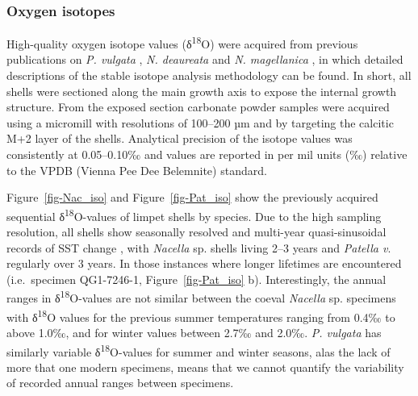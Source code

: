 \documentclass[
  authoryear,
  preprint,
  3p]{elsarticle}
\begin{document}
\subsubsection{Oxygen isotopes}\label{oxygen-isotopes}

High-quality oxygen isotope values (δ\textsuperscript{18}O) were
acquired from previous publications on \emph{P. vulgata}
\citep{Surge2012-ba, Graniero2017-io}, \emph{N. deaureata} and \emph{N.
magellanica} \citep{Nicastro2020-ih}, in which detailed descriptions of
the stable isotope analysis methodology can be found. In short, all
shells were sectioned along the main growth axis to expose the internal
growth structure. From the exposed section carbonate powder samples were
acquired using a micromill with resolutions of 100--200 µm and by
targeting the calcitic M+2 layer of the shells. Analytical precision of
the isotope values was consistently at 0.05--0.10‰ and values are
reported in per mil units (‰) relative to the VPDB (Vienna Pee Dee
Belemnite) standard.

Figure~\ref{fig-Nac_iso} and Figure~\ref{fig-Pat_iso} show the
previously acquired sequential δ\textsuperscript{18}O-values of limpet
shells by species. Due to the high sampling resolution, all shells show
seasonally resolved and multi-year quasi-sinusoidal records of SST
change , with \emph{Nacella} sp. shells living 2--3 years and
\emph{Patella v}. regularly over 3 years. In those instances where
longer lifetimes are encountered (i.e.~specimen QG1-7246-1,
Figure~\ref{fig-Pat_iso} b). Interestingly, the annual ranges in
δ\textsuperscript{18}O-values are not similar between the coeval
\emph{Nacella} sp. specimens with δ\textsuperscript{18}O values for the
previous summer temperatures ranging from 0.4‰ to above 1.0‰, and for
winter values between 2.7‰ and 2.0‰. \emph{P. vulgata} has similarly
variable δ\textsuperscript{18}O-values for summer and winter seasons,
alas the lack of more that one modern specimens, means that we cannot
quantify the variability of recorded annual ranges between specimens.
\end{document}
